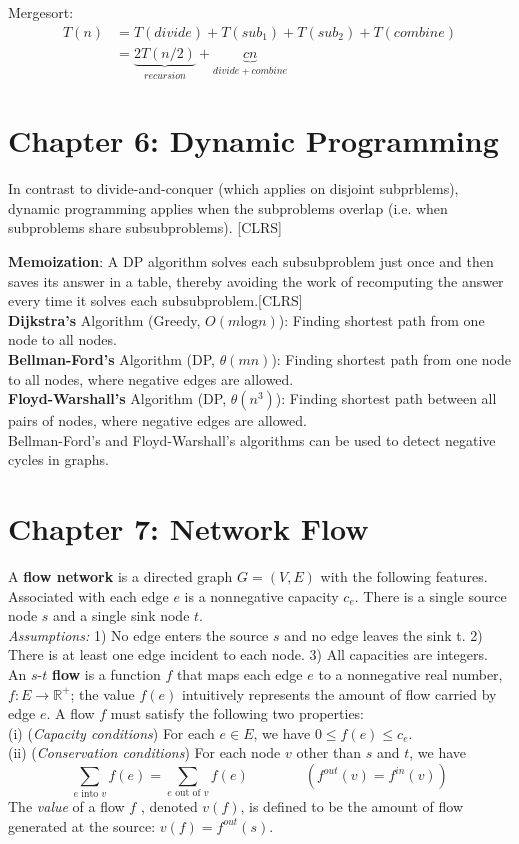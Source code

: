 \documentclass{report}
\begin{document}
Mergesort: 
\begin{align*}
T(n) &= T(divide)+T(sub_1)+T(sub_2)+T(combine)\\
     &=\underbrace{2T(n/2)}_{recursion}+\underbrace{cn}_{divide+combine}
\end{align*}

\section*{Chapter 6: Dynamic Programming}
In contrast to divide-and-conquer (which applies on disjoint subprblems), dynamic programming applies when the subproblems overlap (i.e. when subproblems share subsubproblems). [CLRS]

\textbf{Memoization}: A DP algorithm solves each subsubproblem just once and then saves its answer in a table, thereby avoiding the work of recomputing the answer every time it solves each subsubproblem.[CLRS]\\

\textbf{Dijkstra's} Algorithm (Greedy, $O(m\text{log}n)$): Finding shortest path from one node to all nodes.\\
\textbf{Bellman-Ford's} Algorithm (DP, $\theta(mn)$): Finding shortest path from one node to all nodes, where negative edges are allowed.\\
\textbf{Floyd-Warshall's} Algorithm (DP, $\theta(n^3)$): Finding shortest path between all pairs of nodes, where negative edges are allowed.\\

Bellman-Ford's and Floyd-Warshall's algorithms can be used to detect negative cycles in graphs.

\section*{Chapter 7: Network Flow}
A \textbf{flow network} is a directed graph $G = (V, E)$ with the following features. Associated with each edge $e$ is a nonnegative capacity $c_e$. There is a single source node $s$ and a single sink node $t$.\\

\textit{Assumptions:} 1) No edge enters the source $s$ and no edge leaves the sink t. 2) There is at least one edge incident to each node. 3) All capacities are integers.\\

An $s\text{-}t$ \textbf{flow} is a function $f$ that maps each edge $e$ to a
nonnegative real number, $f:E\rightarrow \mathbb{R}^+$; the value $f(e)$ intuitively represents the
amount of flow carried by edge $e$. A flow $f$ must satisfy the following two properties:\\
(i) (\emph{Capacity conditions}) For each $e \in E$, we have $0 \leq f(e) \leq c_e$.\\
(ii) (\emph{Conservation conditions}) For each node $v$ other than $s$ and $t$, we have
\[\sum_{e \text{ into } v} f(e) = \sum_{e \text{ out of } v} f(e) \qquad \qquad (f^{out}(v)=f^{in}(v))\]
The \emph{value} of a flow $f$ , denoted $v(f)$, is defined to be the amount of flow generated at the source: $v(f) = f^{out}(s)$.\\
\end{document}
